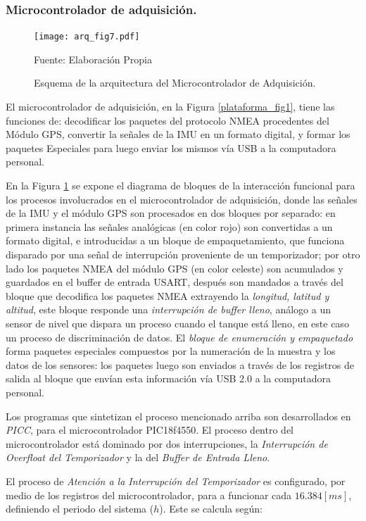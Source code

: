 \documentclass[10pt]{report}
\numberwithin{equation}{chapter}
\numberwithin{algorithm}{chapter}
\begin{document}
\subsubsection{Microcontrolador de adquisición.}
\begin{figure} [t]
\begin{center}
\texttt{[image: arq\_fig7.pdf]}
\caption{Esquema de la arquitectura del Microcontrolador de Adquisición.}
\scriptsize{Fuente: Elaboración Propia}
\label{arq_fig7}
\end{center}
\end{figure}
El microcontrolador de adquisición, en la Figura \ref{plataforma_fig1}, tiene las funciones de: decodificar los paquetes del protocolo NMEA procedentes del Módulo GPS, convertir la señales de la IMU en un formato digital, y formar los paquetes Especiales para luego enviar los mismos vía USB a la computadora personal.\par 
En la Figura \ref{arq_fig7} se expone el diagrama de bloques de la interacción funcional para los procesos involucrados en el microcontrolador de adquisición, donde las señales de la IMU y el módulo GPS son procesados en dos bloques por separado: en primera instancia las señales analógicas (en color rojo) son convertidas a un formato digital, e introducidas a un bloque de empaquetamiento, que funciona disparado por una señal de interrupción proveniente de un temporizador; por otro lado los paquetes NMEA del módulo GPS (en color celeste) son acumulados y guardados en el buffer de entrada USART, después son mandados a través del bloque que decodifica los paquetes NMEA extrayendo la \emph{longitud, latitud y altitud}, este bloque responde una \emph{interrupción de buffer lleno}, análogo a un sensor de nivel que dispara un proceso cuando el tanque está lleno, en este caso un proceso de discriminación de datos. El \emph{bloque de enumeración y empaquetado} forma paquetes especiales compuestos por la numeración de la muestra y los datos de los sensores: los paquetes luego son enviados a través de los registros de salida al bloque que envían esta información vía USB 2.0 a la computadora personal. \par
Los programas que sintetizan el proceso mencionado arriba son desarrollados en \emph{PICC}, para el microcontrolador PIC18f4550. El proceso dentro del microcontrolador está dominado por dos interrupciones, la \emph{Interrupción de Overfloat del Temporizador} y la del \emph{Buffer de Entrada Lleno}.\par
El proceso de \emph{Atención a la Interrupción del Temporizador} es configurado, por medio de los registros del microcontrolador, para a funcionar cada $16.384[ms]$, definiendo el periodo del sistema ($h$). Este se calcula según:
\end{document}
